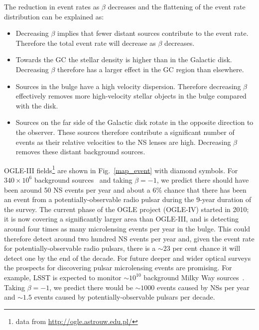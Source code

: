 \documentclass[iop,apj]{emulateapj}
\begin{document}
The reduction in event rates as $\beta$ decreases and the flattening of the event rate distribution 
can be explained as:
\begin{itemize}
\item Decreasing $\beta$ implies that fewer distant sources contribute to the event rate. Therefore 
the total event rate will decrease as $\beta$ decreases.
\item Towards the GC the stellar density is higher than in the Galactic disk. 
Decreasing $\beta$ therefore has a larger effect in the GC region than elsewhere.
\item Sources in the bulge have a high velocity dispersion. Therefore decreasing $\beta$ effectively 
removes more high-velocity stellar objects in the bulge compared with the disk.
\item Sources on the far side of the Galactic disk rotate in the opposite direction to the observer.  
These sources therefore contribute a significant number of events as their relative velocities to the 
NS lenses are high. Decreasing $\beta$ removes these distant background sources.
\end{itemize}


OGLE-III fields\footnote{data from \url{http://ogle.astrouw.edu.pl/}}
are shown in Fig.~\ref{map_event} with diamond symbols.
For $340\times10^6$ background sources~\citep{Szymanski} and taking
$\beta = -1$, we predict there should have been around 50 NS events
per year and about a 6\% chance that there has been an event from a
potentially-observable radio pulsar during the 9-year duration of the
survey.
The current phase of the OGLE project (OGLE-IV) started in 2010; it is
now covering a significantly larger area than OGLE-III, and is
detecting around four times as many microlensing events per year in
the bulge. This could therefore detect around two hundred NS events per
year and, given the event rate for potentially-observable radio
pulsars, there is a $\sim23$ per cent chance it will detect one by the
end of the decade.
%
For future deeper and wider optical surveys the prospects for discovering pulsar microlensing 
events are promising. For example, LSST is expected to monitor $\sim10^{10}$ background Milky Way 
sources~\citep{ivez12a}. Taking $\beta = -1$, we predict there would be $\sim1000$ events caused 
by NSs per year and $\sim1.5$ events caused by potentially-observable pulsars per decade.
\end{document}
